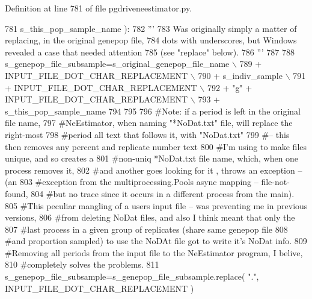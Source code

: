 Definition at line 781 of file pgdriveneestimator.\+py.


\begin{DoxyCode}
781                                                     s\_this\_pop\_sample\_name ):
782     \textcolor{stringliteral}{'''}
783 \textcolor{stringliteral}{    Was originally simply a matter of replacing, in the original genepop file,}
784 \textcolor{stringliteral}{    dots with underscores, but Windows revealed a case that needed attention }
785 \textcolor{stringliteral}{    (see "replace" below).}
786 \textcolor{stringliteral}{    '''}
787 
788     s\_genepop\_file\_subsample=s\_original\_genepop\_file\_name \(\backslash\)
789                                 + INPUT\_FILE\_DOT\_CHAR\_REPLACEMENT \(\backslash\)
790                                 +  s\_indiv\_sample \(\backslash\)
791                                 + INPUT\_FILE\_DOT\_CHAR\_REPLACEMENT \(\backslash\)
792                                 + \textcolor{stringliteral}{"g"} + INPUT\_FILE\_DOT\_CHAR\_REPLACEMENT \(\backslash\)
793                                 + s\_this\_pop\_sample\_name
794 
795 
796     \textcolor{comment}{#Note: if a period is left in the original file name,}
797     \textcolor{comment}{#NeEstimator, when naming "*NoDat.txt" file, will replace the right-most}
798     \textcolor{comment}{#period all text that follows it,  with "NoDat.txt" }
799     \textcolor{comment}{#-- this then removes any percent and replicate number text }
800     \textcolor{comment}{#I'm using to make files unique, and so creates a }
801     \textcolor{comment}{#non-uniq *NoDat.txt file name, which, when one process removes it, }
802     \textcolor{comment}{#and another goes looking for it , throws an exception -- (an }
803     \textcolor{comment}{#exception from the multiprocessing.Pools async mapping -- file-not-found,}
804     \textcolor{comment}{#but no trace since it occurs in a different process from the main).}
805     \textcolor{comment}{#This peculiar mangling of a users input file -- was preventing me in previous versions, }
806     \textcolor{comment}{#from deleting NoDat files, and also I think meant that only the }
807     \textcolor{comment}{#last process in a given group of replicates (share same genepop file}
808     \textcolor{comment}{#and proportion sampled) to use the NoDAt file got to write it's NoDat info. }
809     \textcolor{comment}{#Removing all periods from the input file to the NeEstimator program, I belive,}
810     \textcolor{comment}{#completely solves the problems.}
811     s\_genepop\_file\_subsample=s\_genepop\_file\_subsample.replace( \textcolor{stringliteral}{"."}, INPUT\_FILE\_DOT\_CHAR\_REPLACEMENT )

\end{DoxyCode}
